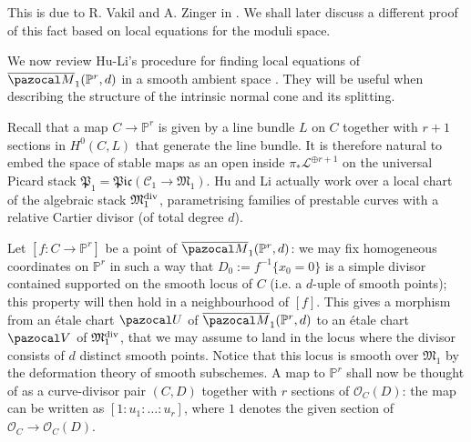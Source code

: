 \documentclass[11pt]{amsart}
\newcommand{\PP}{\mathbb P}
\renewcommand{\to}{\rightarrow}
\newcommand{\cC}{\mathcal C}
\newcommand{\MM}{\mathfrak M}
\newcommand{\oM}{\overline{\pazocal M}}
\theoremstyle{plain}
\theoremstyle{definition}
\begin{document}
This is due to R. Vakil and A. Zinger in \cite{Vre,VZpreview}. We shall later discuss a different proof of this fact based on local equations for the moduli space.

We now review Hu-Li's procedure for finding local equations of $\oM_1(\PP^r,d)$ in a smooth ambient space \cite{HL}. They will be useful when describing the structure of the intrinsic normal cone and its splitting.

Recall that a map $C\to\PP^r$ is given by a line bundle $L$ on $C$ together with $r+1$ sections in $H^0(C,L)$ that generate the line bundle. It is therefore natural to embed the space of stable maps as an open inside $\pi_*\mathcal L^{\oplus r+1}$ on the universal Picard stack $\mathfrak{P}_{1}=\mathfrak{Pic}(\cC_{1}\to\MM_{1})$.
Hu and Li actually work over a local chart of the algebraic stack $\mathfrak M_{1}^{\rm{div}}$, parametrising families of prestable curves with a relative Cartier divisor (of total degree $d$).

Let $[f\colon C\to \PP^r]$ be a point of $\oM_1(\PP^r,d)$: we may fix homogeneous coordinates on $\PP^r$ in such a way that $D_0:=f^{-1}\{x_0=0\}$ is a simple divisor contained supported on the smooth locus of $C$ (i.e. a $d$-uple of smooth points); this property will then hold in a neighbourhood of $[f]$. This gives a morphism from an \'{e}tale chart $\pazocal U$ of $\oM_1(\PP^r,d)$ to an \'{e}tale chart $\pazocal V$ of $\mathfrak M_{1}^{\rm{div}}$, that we may assume to land in the locus where the divisor consists of $d$ distinct smooth points. Notice that this locus is smooth over $\mathfrak M_{1}$ by the deformation theory of smooth subschemes. A map to $\PP^r$ shall now be thought of as a curve-divisor pair $(C,D)$ together with $r$ sections of $\mathcal O_C(D)$: the map can be written as $[1:u_1:\ldots:u_r]$, where $1$ denotes the given section of $\mathcal O_C\to\mathcal O_C(D)$.
\end{document}
